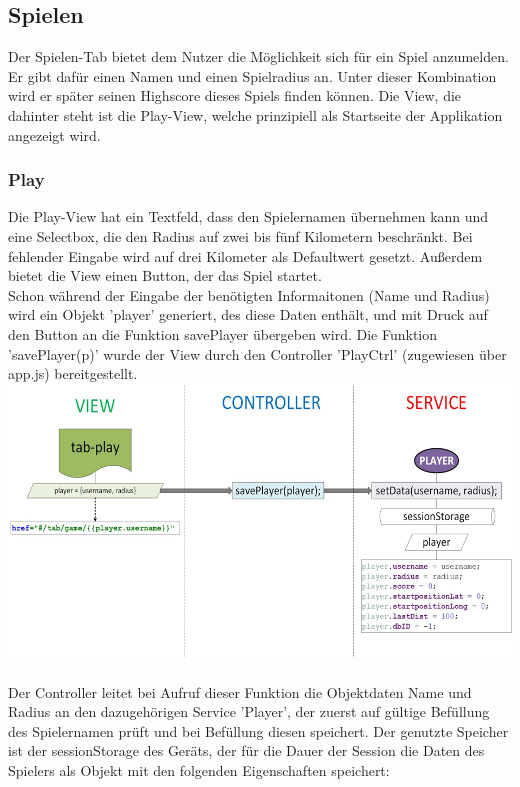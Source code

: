 \subsection{Spielen}
Der Spielen-Tab bietet dem Nutzer die Möglichkeit sich für ein Spiel anzumelden. Er gibt dafür einen Namen und einen Spielradius an. Unter dieser Kombination wird er später seinen Highscore dieses Spiels finden können. Die View, die dahinter steht ist die Play-View, welche prinzipiell als Startseite der Applikation angezeigt wird. 
\subsubsection{Play}
Die Play-View hat ein Textfeld, dass den Spielernamen übernehmen kann und eine Selectbox, die den Radius auf zwei bis fünf Kilometern beschränkt. Bei fehlender Eingabe wird auf drei Kilometer als Defaultwert gesetzt. Außerdem bietet die View einen Button, der das Spiel startet. 
\\
Schon während der Eingabe der benötigten Informaitonen (Name und Radius) wird ein Objekt 'player' generiert, des diese Daten enthält, und mit Druck auf den Button an die Funktion savePlayer übergeben wird. Die Funktion 'savePlayer(p)' wurde der View durch den Controller 'PlayCtrl' (zugewiesen über app.js) bereitgestellt.
\\
\includegraphics[width=1\textwidth]{ref/images/play.png} \\ 
\\
Der Controller leitet bei Aufruf dieser Funktion die Objektdaten Name und Radius an den dazugehörigen Service 'Player', der zuerst auf gültige Befüllung des Spielernamen prüft und bei Befüllung diesen speichert. Der genutzte Speicher ist der sessionStorage des Geräts, der für die Dauer der Session die Daten des Spielers als Objekt mit den folgenden Eigenschaften speichert: 

